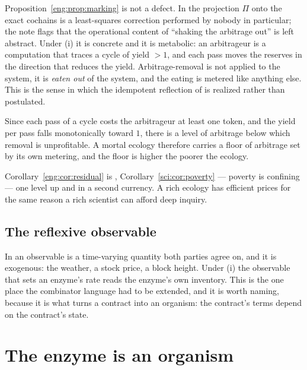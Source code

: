 \begin{remark}\label{eng:trading-what-removes-arbitrage}
Proposition~\ref{eng:prop:marking} is not a defect. In \cite{vtok} the
projection $\Pi$ onto the exact cochains is a least-squares correction
performed by nobody in particular; the note flags that the operational
content of ``shaking the arbitrage out'' is left abstract. Under (i) it is
concrete and it is metabolic: an arbitrageur is a computation that traces a
cycle of yield $> 1$, and each pass moves the reserves in the direction
that reduces the yield. Arbitrage-removal is not applied to the system, it
is \emph{eaten out} of the system, and the eating is metered like anything
else. This is the sense in which the idempotent reflection of
\cite[Prop.~3.4]{vtok} is realized rather than postulated.
\end{remark}

\begin{corollary}\label{eng:cor:residual}
Since each pass of a cycle costs the arbitrageur at least one token, and
the yield per pass falls monotonically toward $1$, there is a level of
arbitrage below which removal is unprofitable. A mortal ecology therefore
carries a floor of arbitrage set by its own metering, and the floor is
higher the poorer the ecology.
\end{corollary}

Corollary~\ref{eng:cor:residual} is \chSci, Corollary~\ref{sci:cor:poverty} --- poverty is
confining --- one level up and in a second currency. A rich ecology has
efficient prices for the same reason a rich scientist can afford deep
inquiry.

\subsection{The reflexive observable}\label{eng:S3.3}

In \cite{SPJ2000} an observable is a time-varying quantity both parties
agree on, and it is exogenous: the weather, a stock price, a block height.
Under (i) the observable that sets an enzyme's rate reads the enzyme's own
inventory. This is the one place the combinator language had to be
extended, and it is worth naming, because it is what turns a contract into
an organism: the contract's terms depend on the contract's state.

\section{The enzyme is an organism}\label{eng:S4}
\label{eng:sec:organism}

